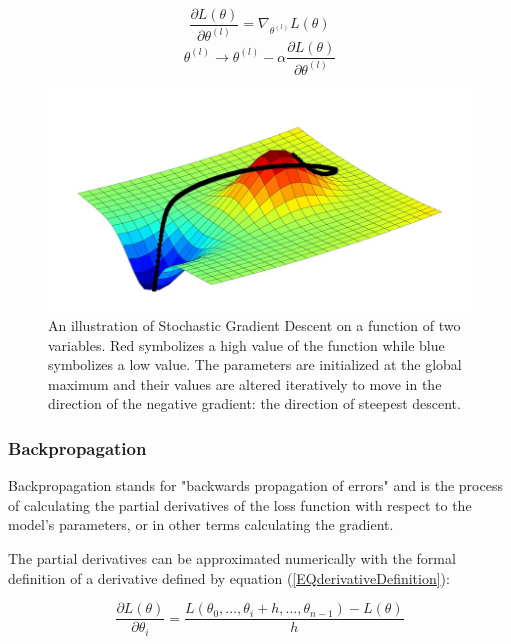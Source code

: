 \documentclass[a4paper,11pt,twoside]{article}
\newcommand*{\pd}[2]{\ensuremath{\dfrac{\partial #1}{\partial #2}}}
\begin{document}
\begin{equation}\label{EQgradient}
\pd{L(\theta)}{\theta^{(l)}} = \nabla_{\theta^{(l)}} L(\theta)
\end{equation}
\begin{equation}\label{SGD}
\theta^{(l)} \to \theta^{(l)} - \alpha \pd{L(\theta)}{\theta^{(l)}}
\end{equation}
\begin{figure}[h]
	\centering
  		\includegraphics[scale=0.5]{SGD.png}
  	\caption{An illustration of Stochastic Gradient Descent on a function of two variables. Red symbolizes a high value of the function while blue symbolizes a low value. The parameters are initialized at the global maximum and their values are altered iteratively to move in the direction of the negative gradient: the direction of steepest descent. \cite{figSGD}} \label{figSGD}
\end{figure}

\subsubsection{Backpropagation}
Backpropagation stands for "backwards propagation of errors" and is the process of calculating the partial derivatives of the loss function with respect to the model's parameters, or in other terms calculating the gradient. \cite{wikiStanford} \cite{gradient}

The partial derivatives can be approximated numerically with the formal definition of a derivative defined by equation (\ref{EQderivativeDefinition}): \cite{wikiStanford} \cite{gradient}

\begin{equation}\label{EQderivativeDefinition}
\pd{L(\theta)}{\theta_{i}} = \frac{L(\theta_{0},...,\theta_{i} + h, ..., \theta_{n-1})-L(\theta)}{h}
\end{equation}
\end{document}
